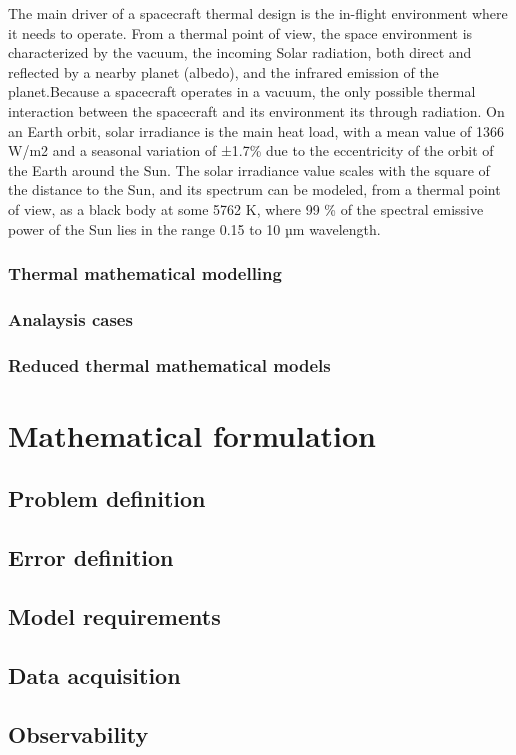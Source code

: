The main driver of a spacecraft thermal design is the in-flight environment where it needs to operate. From a thermal point of view, the space environment is characterized by the vacuum, the incoming Solar radiation, both direct and reflected by a nearby planet (albedo), and the infrared
emission of the planet.Because a spacecraft operates in a vacuum, the only possible thermal interaction between the spacecraft and its environment its through radiation. On an Earth orbit, solar irradiance is the main heat load, with a mean value of 1366 W/m2 and a seasonal variation of ±1.7\% due to the eccentricity of the orbit of the Earth around the Sun. The solar irradiance value scales with the square of the distance to the Sun, and its spectrum can be modeled, from a thermal point of view, as a black body at some 5762 K, where 99 \% of the spectral emissive power of the Sun lies in the range 0.15 to 10 µm wavelength.

\subsection{Thermal mathematical modelling}
\subsection{Analaysis cases}
\subsection{Reduced thermal mathematical models}

\chapter{Mathematical formulation}
\section{Problem definition}
\section{Error definition}
\section{Model requirements}
\section{Data acquisition}
\section{Observability}
